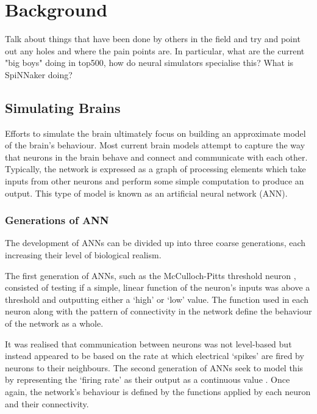\chapter{Background}
	\label{chap:background}
	
	Talk about things that have been done by others in the field and try and point
	out any holes and where the pain points are. In particular, what are the
	current "big boys" doing in top500, how do neural simulators specialise this?
	What is SpiNNaker doing?
	
	\section{Simulating Brains}
		
		\label{sec:simulating-brains}
		
		
		Efforts to simulate the brain ultimately focus on building an approximate
		model of the brain's behaviour. Most current brain models attempt to capture
		the way that neurons in the brain behave and connect and communicate with
		each other. Typically, the network is expressed as a graph of processing
		elements which take inputs from other neurons and perform some simple
		computation to produce an output. This type of model is known as an
		artificial neural network (ANN).
		
		\subsection{Generations of ANN}
			
			The development of ANNs can be divided up into three coarse generations,
			each increasing their level of biological realism.
			
			The first generation of ANNs, such as the McCulloch-Pitts threshold neuron
			\cite{mcculloch43}, consisted of testing if a simple, linear function of
			the neuron's inputs was above a threshold and outputting either a `high'
			or `low' value. The function used in each neuron along with the pattern of
			connectivity in the network define the behaviour of the network as a
			whole.
			
			It was realised that communication between neurons was not level-based but
			instead appeared to be based on the rate at which electrical `spikes' are
			fired by neurons to their neighbours. The second generation of ANNs seek
			to model this by representing the `firing rate' as their output as a
			continuous value \cite{maass97}. Once again, the network's behaviour is
			defined by the functions applied by each neuron and their connectivity.
			
